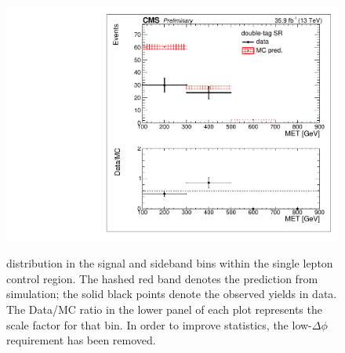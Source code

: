 \begin{figure}[hbp!]
\includegraphics[trim={5px 5px 5px 5px},clip,width=0.45\linewidth]{figs/ABCDscaleFactors_MET_double-tagSR_lowDeltaPhi_singleLep.pdf}\\
\caption{
 \ptmiss distribution in the signal and sideband bins within the single lepton control region. The hashed red band denotes the prediction from simulation; the solid black points denote the observed yields in data. The Data/MC ratio in the lower panel of each plot represents the scale factor for that bin. In order to improve statistics, the low-$\Delta\phi$ requirement has been removed.
}
\label{fig:closuresinglelep}
\end{figure}

